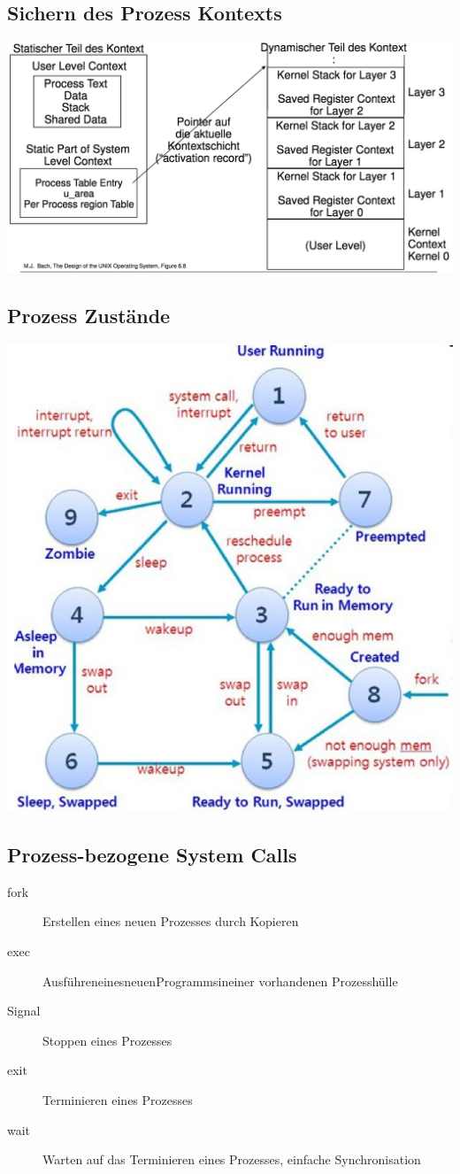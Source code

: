 \documentclass[a4paper, 10pt]{article}
\begin{document}
\subsection{Sichern des Prozess Kontexts}
\includegraphics[scale=0.3]{save_process_context.png}

\subsection{Prozess Zust\"ande}
\includegraphics[scale=0.5]{process_states.png}

\subsection{Prozess-bezogene System Calls}
\begin{description}
	\item[fork] Erstellen eines neuen Prozesses durch Kopieren
	\item[exec] AusführeneinesneuenProgrammsineiner vorhandenen Prozesshülle
	\item[Signal] Stoppen eines Prozesses
	\item[exit] Terminieren eines Prozesses
	\item[wait] Warten auf das Terminieren eines Prozesses, einfache Synchronisation
\end{description}
\end{document}
